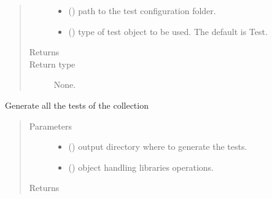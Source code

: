 \documentclass[letterpaper,10pt,english]{sphinxmanual}
\begin{document}
\begin{fulllineitems}
\begin{quote}
\begin{description}
\begin{itemize}
\item {} 
 () \textendash{} path to the test configuration folder.

\item {} 
 ({\hyperref[\detokenize{api/inputgeneration:testrun.Test}]{}}\sphinxstyleliteralemphasis{\sphinxupquote{, }}) \textendash{} type of test object to be used. The default is Test.

\end{itemize}

\item[{Returns}] \leavevmode


\item[{Return type}] \leavevmode
None.

\end{description}\end{quote}

\begin{fulllineitems}
\label{\detokenize{api/inputgeneration:testrun.MultipleTest.generate_test}}
Generate all the tests of the collection
\begin{quote}\begin{description}
\item[{Parameters}] \leavevmode\begin{itemize}
\item {} 
 () \textendash{} output directory where to generate the tests.

\item {} 
 ({\hyperref[\detokenize{api/initobjects:libmanager.LibManager}]{}}) \textendash{} object handling libraries operations.

\end{itemize}

\item[{Returns}] \leavevmode



\end{description}
\end{quote}
\end{fulllineitems}
\end{fulllineitems}
\end{document}
